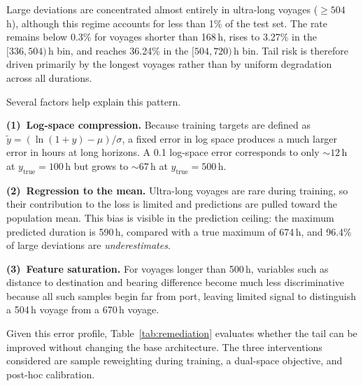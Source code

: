 \documentclass[conference]{IEEEtran}
\begin{document}
Large deviations are concentrated almost entirely in ultra-long voyages ($\geq 504$\,h), although this regime accounts for less than 1\% of the test set. The rate remains below 0.3\% for voyages shorter than 168\,h, rises to 3.27\% in the $[336, 504)$\,h bin, and reaches 36.24\% in the $[504, 720)$\,h bin. Tail risk is therefore driven primarily by the longest voyages rather than by uniform degradation across all durations.

Several factors help explain this pattern.

\textbf{(1)~Log-space compression.}
Because training targets are defined as $\tilde{y} = (\ln(1+y) - \mu) / \sigma$, a fixed error in log space produces a much larger error in hours at long horizons. A 0.1 log-space error corresponds to only ${\sim}12$\,h at $y_{\text{true}} = 100$\,h but grows to ${\sim}67$\,h at $y_{\text{true}} = 500$\,h.

\textbf{(2)~Regression to the mean.}
Ultra-long voyages are rare during training, so their contribution to the loss is limited and predictions are pulled toward the population mean. This bias is visible in the prediction ceiling: the maximum predicted duration is 590\,h, compared with a true maximum of 674\,h, and 96.4\% of large deviations are \textit{underestimates}.

\textbf{(3)~Feature saturation.}
For voyages longer than 500\,h, variables such as distance to destination and bearing difference become much less discriminative because all such samples begin far from port, leaving limited signal to distinguish a 504\,h voyage from a 670\,h voyage.

Given this error profile, Table~\ref{tab:remediation} evaluates whether the tail can be improved without changing the base architecture. The three interventions considered are sample reweighting during training, a dual-space objective, and post-hoc calibration.
\end{document}
